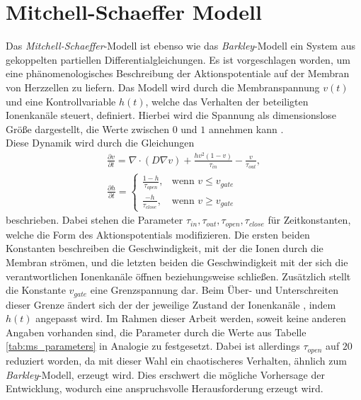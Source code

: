 \section{Mitchell-Schaeffer Modell}
Das \textit{Mitchell-Schaeffer}-Modell ist ebenso wie das \textit{Barkley}-Modell ein System aus gekoppelten partiellen Differentialgleichungen. Es ist vorgeschlagen worden, um eine phänomenologisches Beschreibung der Aktionspotentiale auf der Membran von Herzzellen zu liefern. Das Modell wird durch die Membranspannung $v(t)$ und eine Kontrollvariable $h(t)$, welche das Verhalten der beteiligten Ionenkanäle steuert, definiert. Hierbei wird die Spannung als dimensionslose Größe dargestellt, die Werte zwischen $0$ und $1$ annehmen kann \citep{mitchell2003two}.\\

Diese Dynamik wird durch die Gleichungen 
\begin{equation}
\begin{gathered}
\frac{\partial v}{\partial t} = \nabla \cdot (D \nabla v) + \frac{h v^2(1-v)}{\tau_{in}} - \frac{v}{\tau_{out}},\\
\frac{\partial h}{\partial t} =
\begin{cases}
	\frac{1-h}{\tau_{open}},& \text{wenn } v \leq v_{gate}\\
    \frac{-h}{\tau_{close}},& \text{wenn } v \geq v_{gate}
\end{cases}
\end{gathered}
\end{equation}
beschrieben. Dabei stehen die Parameter $\tau_{in}, \tau_{out}, \tau_{open}, \tau_{close}$ für Zeitkonstanten, welche die Form des Aktionspotentials modifizieren. Die ersten beiden Konstanten beschreiben die Geschwindigkeit, mit der die Ionen durch die Membran strömen, und die letzten beiden die Geschwindigkeit mit der sich die verantwortlichen Ionenkanäle öffnen beziehungsweise schließen. Zusätzlich stellt die Konstante $v_{gate}$ eine Grenzspannung dar. Beim Über- und Unterschreiten dieser Grenze ändert sich der der jeweilige Zustand der Ionenkanäle , indem $h(t)$ angepasst wird. Im Rahmen dieser Arbeit werden, soweit keine anderen Angaben vorhanden sind, die Parameter durch die Werte aus Tabelle \ref{tab:ms_parameters} in Analogie zu \citep{mitchell2003two} festgesetzt. Dabei ist allerdings $\tau_{open}$ auf $20$ \citep[S. 134ff.]{bartocci2016computational} reduziert worden, da mit dieser Wahl ein chaotischeres Verhalten, ähnlich zum \textit{Barkley}-Modell, erzeugt wird. Dies erschwert die mögliche Vorhersage der Entwicklung, wodurch eine anspruchsvolle Herausforderung erzeugt wird.\\

